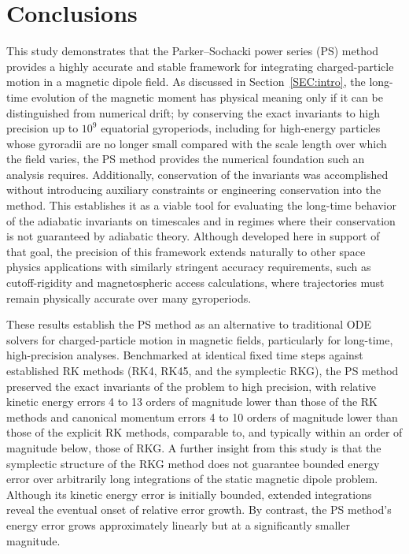 \documentclass{article}
\begin{document}
\section{Conclusions}\label{SEC:Conclusions}
This study demonstrates that the Parker--Sochacki power series (PS) method provides a highly accurate and stable framework for integrating charged-particle motion in a magnetic dipole field. As discussed in Section~\ref{SEC:intro}, the long-time evolution of the magnetic moment has physical meaning only if it can be distinguished from numerical drift; by conserving the exact invariants to high precision up to $10^9$ equatorial gyroperiods, including for high-energy particles whose gyroradii are no longer small compared with the scale length over which the field varies, the PS method provides the numerical foundation such an analysis requires. Additionally, conservation of the invariants was accomplished without introducing  auxiliary constraints or engineering conservation into the method. This establishes it as a viable tool for evaluating the long-time behavior of the adiabatic invariants on timescales and in regimes where their conservation is not guaranteed by adiabatic theory. Although developed here in support of that goal, the precision of this framework extends naturally to other space physics applications with similarly stringent accuracy requirements, such as cutoff-rigidity and magnetospheric access calculations, where trajectories must remain physically accurate over many gyroperiods.

These results establish the PS method as an alternative to traditional ODE solvers for charged-particle motion in magnetic fields, particularly for long-time, high-precision analyses. Benchmarked at identical fixed time steps against established RK methods (RK4, RK45, and the symplectic RKG), the PS method preserved the exact invariants of the problem to high precision, with relative kinetic energy errors 4 to 13 orders of magnitude lower than those of the RK methods and canonical momentum errors 4 to 10 orders of magnitude lower than those of the explicit RK methods, comparable to, and typically within an order of magnitude below, those of RKG. A further insight from this study is that the symplectic structure of the RKG method does not guarantee bounded energy error over arbitrarily long integrations of the static magnetic dipole problem. Although its kinetic energy error is initially bounded, extended integrations reveal the eventual onset of relative error growth. By contrast, the PS method's energy error grows approximately linearly but at a significantly smaller magnitude. 
\end{document}
